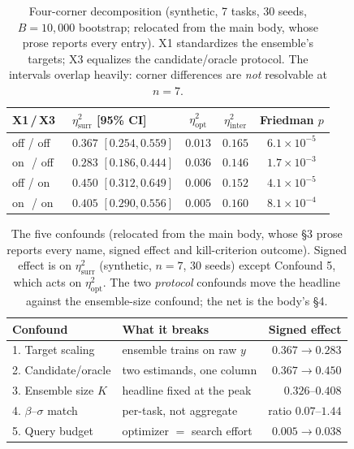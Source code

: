 \documentclass[letterpaper]{article}
\theoremstyle{plain}
\begin{document}
\begin{table}[t]\centering
\caption{Four-corner decomposition (synthetic, 7 tasks, 30 seeds, $B{=}10{,}000$ bootstrap; relocated from the main body, whose prose reports every entry). X1 standardizes the ensemble's targets; X3 equalizes the candidate/oracle protocol. The intervals overlap heavily: corner differences are \emph{not} resolvable at $n{=}7$.}
\label{tab:corners}
\small
\setlength{\tabcolsep}{3.5pt}
\begin{tabular}{llccc}
\toprule
X1\,/\,X3 & $\eta^2_{\text{surr}}$ [95\% CI] & $\eta^2_{\text{opt}}$ & $\eta^2_{\text{inter}}$ & Friedman $p$ \\
\midrule
off / off & $0.367$ $[0.254,0.559]$ & $0.013$ & $0.165$ & $6.1\times10^{-5}$ \\
on\ \,/ off & $0.283$ $[0.186,0.444]$ & $0.036$ & $0.146$ & $1.7\times10^{-3}$ \\
off / on\ \, & $0.450$ $[0.312,0.649]$ & $0.006$ & $0.152$ & $4.1\times10^{-5}$ \\
on\ \,/ on\ \, & $\mathbf{0.405}$ $[0.290,0.556]$ & $0.005$ & $0.160$ & $8.1\times10^{-4}$ \\
\bottomrule
\end{tabular}
\end{table}

\begin{table}[t]\centering
\caption{The five confounds (relocated from the main body, whose \S3 prose reports every name, signed effect and kill-criterion outcome). Signed effect is on $\eta^2_{\text{surr}}$ (synthetic, $n{=}7$, 30 seeds) except Confound 5, which acts on $\eta^2_{\text{opt}}$. The two \emph{protocol} confounds move the headline against the ensemble-size confound; the net is the body's \S4.}
\label{tab:confounds}
\small
\setlength{\tabcolsep}{2pt}
\begin{tabular}{llr}
\toprule
Confound & What it breaks & Signed effect \\
\midrule
1. Target scaling      & ensemble trains on raw $y$ & $0.367\!\to\!0.283$ \\
2. Candidate/oracle    & two estimands, one column  & $0.367\!\to\!0.450$ \\
3. Ensemble size $K$   & headline fixed at the peak & $0.326$--$0.408$ \\
4. $\beta$--$\sigma$ match & per-task, not aggregate & ratio $0.07$--$1.44$ \\
5. Query budget        & optimizer $=$ search effort & $0.005\!\to\!0.038$ \\
\bottomrule
\end{tabular}
\end{table}
\end{document}
